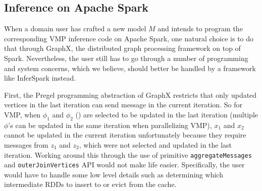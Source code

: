 


\subsection{Inference on Apache Spark}
When a domain user has crafted a new model $M$
and intends to program 
the corresponding VMP inference code on Apache Spark,
one natural choice is to do that through GraphX, the distributed graph processing framework on top of Spark.
Nevertheless, the user still has to go through a number of programming and system concerns,
which we believe, should better be handled by a framework like InferSpark instead.

First, %
the Pregel programming abstraction of GraphX
restricts that only updated vertices in the last iteration can send message in
the current iteration.
So for VMP,  
when $\phi_1$ and $\phi_2$ ()
are selected to be updated
in the last iteration (multiple $\phi$'s can be updated in the same iteration when parallelizing VMP), 
$x_1$ and $x_2$ 
cannot be updated in the current iteration unfortunately 
because they require messages from $z_1$ and $z_2$, which were not selected and updated in the last iteration.
Working around this 
%
through the use of primitive  \texttt{aggregateMessages} and \texttt{outerJoinVertices} API
 would not make life easier.
 Specifically, the user would have to 
 handle some low level details such as determining which intermediate RDDs 
 to insert to or evict from the cache.
 
